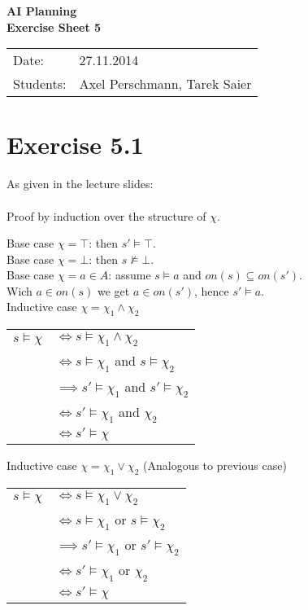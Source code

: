 \documentclass[11pt,a4paper]{article}
\begin{document}
\begin{center}
\Huge{\textbf{AI Planning}}\\
\LARGE{\textbf{Exercise Sheet 5}}
\end{center}
\vspace{2cm}
\begin{tabular}{ll}
Date: & 27.11.2014\\
Students: & Axel Perschmann, Tarek Saier
\end{tabular}

\section*{Exercise 5.1}
As given in the lecture slides:\\
\\
Proof by induction over the structure of $\chi$.

Base case $\chi = \top$: then $s' \models \top$.\\
Base case $\chi = \bot$: then $s \not\models \bot$.\\

Base case $\chi = a \in A$: assume $s \models a$ and $on(s) \subseteq on(s')$. \\
Wich $a \in on(s)$ we get $a \in on(s')$, hence $s' \models a$.\\

Inductive case $\chi = \chi_1 \land \chi_2$

\begin{tabular}{l l}
$s \models \chi$ & $\iff  s \models \chi_1 \land \chi_2$ \\
 & $\iff  s \models \chi_1$ and $s \models \chi_2$\\
 & $\implies s' \models \chi_1$ and $s' \models \chi_2$\\
 & $\iff s' \models \chi_1$ and $\chi_2$ \\
 & $\iff s' \models \chi$ 
\end{tabular}
 
Inductive case $\chi = \chi_1 \lor \chi_2$ (Analogous to previous case)

\begin{tabular}{l l}
$s \models \chi$ & $\iff  s \models \chi_1 \lor \chi_2$ \\
 & $\iff  s \models \chi_1$ or $s \models \chi_2$\\
 & $\implies s' \models \chi_1$ or $s' \models \chi_2$\\
 & $\iff s' \models \chi_1$ or $\chi_2$ \\
 & $\iff s' \models \chi$ 
\end{tabular}
\end{document}
